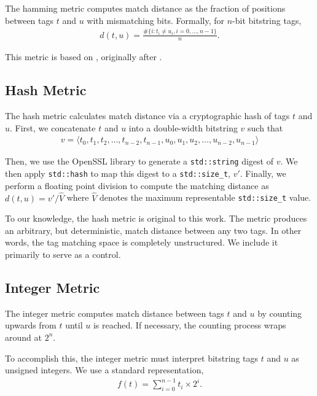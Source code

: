 The hamming metric computes match distance as the fraction of positions between tags $t$ and $u$ with mismatching bits.
Formally, for $n$-bit bitstring tags,
\begin{align*}
d(t, u)
= \frac{
  \#\{ i : t_i \neq u_i, i=0, \dots ,n-1\}
}{
  n
}.
\end{align*}

This metric is based on \cite{lalejini2019else}, originally after \cite{hamming1950error}.

\subsection{Hash Metric} \label{sec:hash}

The hash metric calculates match distance via a cryptographic hash of tags $t$ and $u$.
First, we concatenate $t$ and $u$ into a double-width bitstring $v$ such that
\begin{align*}
v = \langle t_0, t_1, t_2, \dots, t_{n-2}, t_{n-1}, u_0, u_1, u_2, \dots, u_{n-2}, u_{n-1} \rangle
\end{align*}

Then, we use the OpenSSL library to generate a \texttt{std::string} digest of $v$.
We then apply \texttt{std::hash} to map this digest to a \texttt{std::size\_t}, $v'$.
Finally, we perform a floating point division to compute the matching distance as $d(t, u) = v' / \hat{V}$ where $\hat{V}$  denotes the maximum representable \texttt{std::size\_t} value.

To our knowledge, the hash metric is original to this work.
The metric produces an arbitrary, but deterministic, match distance between any two tags.
In other words, the tag matching space is completely unstructured.
We include it primarily to serve as a control.

\subsection{Integer Metric} \label{sec:integer}

The integer metric computes match distance between tags $t$ and $u$ by counting upwards from $t$ until $u$ is reached.
If necessary, the counting process wraps around at $2^n$.

To accomplish this, the integer metric must interpret bitstring tags $t$ and $u$ as unsigned integers.
We use a standard representation,
\begin{align*}
f(t)
= \sum_{i=0}^{n-1} t_i \times 2^i.
\end{align*}

